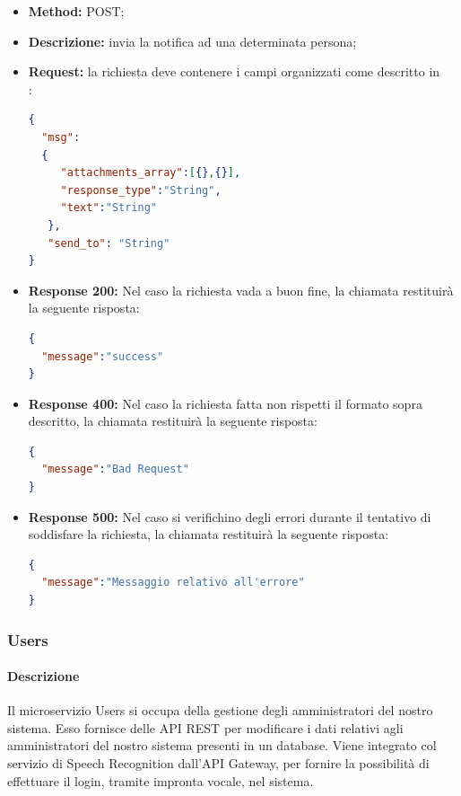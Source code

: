 \begin{itemize}
\begin{itemize}
\item \textbf{Method:} POST;
\item \textbf{Descrizione:} invia la notifica ad una determinata persona;
\item \textbf{Request:} la richiesta deve contenere i campi organizzati come descritto in \\:
\begin{lstlisting}[language=json,firstnumber=1]
{
  "msg":
  {
     "attachments_array":[{},{}],
	 "response_type":"String",
	 "text":"String"
   },
   "send_to": "String"
}
\end{lstlisting}
\item \textbf{Response 200:} Nel caso la richiesta vada a buon fine, la chiamata restituirà la seguente risposta:
\begin{lstlisting}[language=json,firstnumber=1]
{
  "message":"success"
}
\end{lstlisting}
\item \textbf{Response 400:} Nel caso la richiesta fatta non rispetti il formato sopra descritto, la chiamata restituirà la seguente risposta:
\begin{lstlisting}[language=json,firstnumber=1]
{
  "message":"Bad Request"
}
\end{lstlisting}
\item \textbf{Response 500:} Nel caso si verifichino degli errori durante il tentativo di soddisfare la richiesta, la chiamata restituirà la seguente risposta:
\begin{lstlisting}[language=json,firstnumber=1]
{
  "message":"Messaggio relativo all'errore"
}
\end{lstlisting}
\end{itemize}
\end{itemize}

\subsubsection{Users}
\paragraph{Descrizione}
Il microservizio Users si occupa della gestione degli amministratori del nostro sistema. Esso fornisce delle API REST per modificare i dati relativi agli amministratori del nostro sistema presenti in un database. Viene integrato col servizio di Speech Recognition dall'API Gateway, per fornire la possibilità di effettuare il login, tramite impronta vocale, nel sistema.
